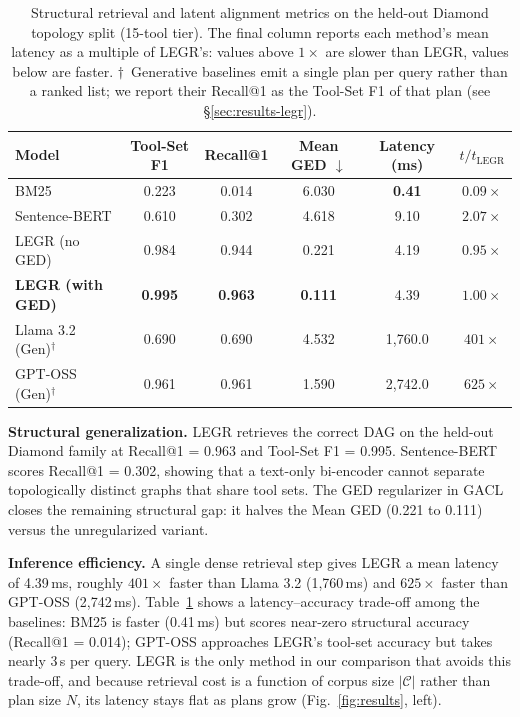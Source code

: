 \documentclass{article}
\begin{document}
\begin{table}[h]
\caption{Structural retrieval and latent alignment metrics on the held-out Diamond topology split (15-tool tier). The final column reports each method's mean latency as a multiple of LEGR's: values above $1\times$ are slower than LEGR, values below are faster. $\dagger$~Generative baselines emit a single plan per query rather than a ranked list; we report their Recall@1 as the Tool-Set F1 of that plan (see \S\ref{sec:results-legr}).}
\label{tab:retrieval_metrics}
\centering
\small
\begin{tabular}{@{}lccccc@{}}
\toprule
\textbf{Model} & \textbf{Tool-Set F1} & \textbf{Recall@1} & \textbf{Mean GED $\downarrow$} & \textbf{Latency (ms)} & \textbf{$t/t_{\text{LEGR}}$} \\
\midrule
BM25             & 0.223 & 0.014 & 6.030 & \textbf{0.41} & $0.09\times$ \\
Sentence-BERT           & 0.610 & 0.302 & 4.618 & 9.10 & $2.07\times$ \\
\midrule
LEGR (no GED)    & 0.984 & 0.944 & 0.221 & 4.19 & $0.95\times$ \\
\textbf{LEGR (with GED)} & \textbf{0.995} & \textbf{0.963} & \textbf{0.111} & 4.39 & $1.00\times$ \\
\midrule
Llama 3.2 (Gen)$^\dagger$  & 0.690 & 0.690 & 4.532 & 1,760.0 & $401\times$ \\
GPT-OSS (Gen)$^\dagger$    & 0.961 & 0.961 & 1.590 & 2,742.0 & $625\times$ \\
\bottomrule
\end{tabular}
\end{table}

\textbf{Structural generalization.} LEGR retrieves the correct DAG on the held-out Diamond family at Recall@1 = 0.963 and Tool-Set F1 = 0.995. Sentence-BERT scores Recall@1 = 0.302, showing that a text-only bi-encoder cannot separate topologically distinct graphs that share tool sets. The GED regularizer in GACL closes the remaining structural gap: it halves the Mean GED (0.221 to 0.111) versus the unregularized variant.

\textbf{Inference efficiency.} A single dense retrieval step gives LEGR a mean latency of 4.39\,ms, roughly $401\times$ faster than Llama 3.2 (1,760\,ms) and $625\times$ faster than GPT-OSS (2,742\,ms). Table~\ref{tab:retrieval_metrics} shows a latency--accuracy trade-off among the baselines: BM25 is faster (0.41\,ms) but scores near-zero structural accuracy (Recall@1 = 0.014); GPT-OSS approaches LEGR's tool-set accuracy but takes nearly 3\,s per query. LEGR is the only method in our comparison that avoids this trade-off, and because retrieval cost is a function of corpus size $|\mathcal{C}|$ rather than plan size $N$, its latency stays flat as plans grow (Fig.~\ref{fig:results}, left).
\end{document}
